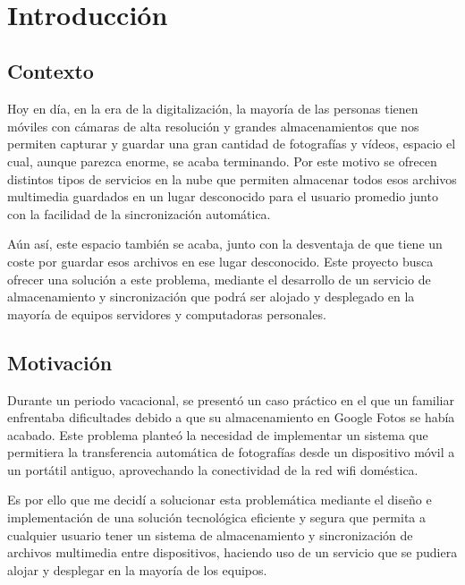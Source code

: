 \newpage
~
\newpage
\section{Introducción}


\subsection{Contexto}
Hoy en día, en la era de la digitalización, la mayoría de las personas tienen móviles con cámaras de alta resolución y grandes almacenamientos que nos permiten capturar y guardar una gran cantidad de fotografías y vídeos, espacio el cual, aunque parezca enorme, se acaba terminando. Por este motivo se ofrecen distintos tipos de servicios en la nube que permiten almacenar todos esos archivos multimedia guardados en un lugar desconocido para el usuario promedio junto con la facilidad de la sincronización automática.

Aún así, este espacio también se acaba, junto con la desventaja de que tiene un coste por guardar esos archivos en ese lugar desconocido. Este proyecto busca ofrecer una solución a este problema, mediante el desarrollo de un servicio de almacenamiento y sincronización que podrá ser alojado y desplegado en la mayoría de equipos servidores y computadoras personales.

\subsection{Motivación}
Durante un periodo vacacional, se presentó un caso práctico en el que un familiar enfrentaba dificultades debido a que su almacenamiento en Google Fotos se había acabado. Este problema planteó la necesidad de implementar un sistema que permitiera la transferencia automática de fotografías desde un dispositivo móvil a un portátil antiguo, aprovechando la conectividad de la red wifi doméstica.

Es por ello que me decidí a solucionar esta problemática mediante el diseño e implementación de una solución tecnológica eficiente y segura que permita a cualquier usuario tener un sistema de almacenamiento y sincronización de archivos multimedia entre dispositivos, haciendo uso de un servicio que se pudiera alojar y desplegar en la mayoría de los equipos.

